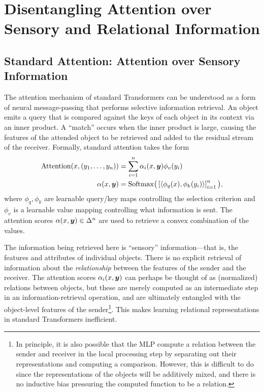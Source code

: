 \section{Disentangling Attention over Sensory and Relational Information}

\subsection{Standard Attention: Attention over Sensory Information}

The attention mechanism of standard Transformers can be understood as a form of neural message-passing that performs selective information retrieval. An object emits a query that is compared against the keys of each object in its context via an inner product. A ``match'' occurs when the inner product is large, causing the features of the attended object to be retrieved and added to the residual stream of the receiver. Formally, standard attention takes the form
\begin{equation}\label{eq:self_attn}
  \begin{split}
    \mathrm{Attention}(x, (y_1, \ldots, y_n)) &= \sum_{i=1}^{n} \alpha_i(x, \bm{y}) \phi_v(y_i) \\
    \alpha(x, \bm{y}) &= \mathrm{Softmax}\big(\left[\left \langle \phi_q(x), \phi_k(y_i) \right\rangle\right]_{i=1}^{n}\big),
  \end{split}
\end{equation}
where $\phi_q,\phi_k$ are learnable query/key maps controlling the selection criterion and $\phi_v$ is a learnable value mapping controlling what information is sent. The attention scores $\alpha(x, \bm{y}) \in \Delta^n$ are used to retrieve a convex combination of the values.

The information being retrieved here is ``sensory'' information---that is, the features and attributes of individual objects. There is no explicit retrieval of information about the \textit{relationship} between the features of the sender and the receiver. The attention scores $\alpha_i(x, \bm{y})$ can perhaps be thought of as (normalized) relations between objects, but these are merely computed as an intermediate step in an information-retrieval operation, and are ultimately entangled with the object-level features of the sender\footnote{In principle, it is also possible that the MLP compute a relation between the sender and receiver in the local processing step by separating out their representations and computing a comparison. However, this is difficult to do since the representations of the objects will be additively mixed, and there is no inductive bias pressuring the computed function to be a relation.}. This makes learning relational representations in standard Transformers inefficient.

